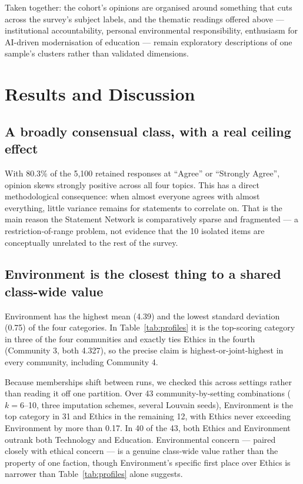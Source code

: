 \documentclass[11pt,a4paper]{article}
\begin{document}
Taken together: the cohort's opinions are organised around something that cuts across the survey's subject labels, and the thematic readings offered above --- institutional accountability, personal environmental responsibility, enthusiasm for AI-driven modernisation of education --- remain exploratory descriptions of one sample's clusters rather than validated dimensions.

\section{Results and Discussion}\label{sec:results}

\subsection{A broadly consensual class, with a real ceiling effect}\label{sec:ceiling}
With 80.3\% of the 5,100 retained responses at ``Agree'' or ``Strongly Agree'', opinion skews strongly positive across all four topics. This has a direct methodological consequence: when almost everyone agrees with almost everything, little variance remains for statements to correlate on. That is the main reason the Statement Network is comparatively sparse and fragmented --- a restriction-of-range problem, not evidence that the 10 isolated items are conceptually unrelated to the rest of the survey.

\subsection{Environment is the closest thing to a shared class-wide value}
Environment has the highest mean (4.39) and the lowest standard deviation (0.75) of the four categories. In Table~\ref{tab:profiles} it is the top-scoring category in three of the four communities and exactly ties Ethics in the fourth (Community 3, both 4.327), so the precise claim is highest-or-joint-highest in every community, including Community 4.

Because memberships shift between runs, we checked this across settings rather than reading it off one partition. Over 43 community-by-setting combinations ($k = 6$--10, three imputation schemes, several Louvain seeds), Environment is the top category in 31 and Ethics in the remaining 12, with Ethics never exceeding Environment by more than 0.17. In 40 of the 43, both Ethics and Environment outrank both Technology and Education. Environmental concern --- paired closely with ethical concern --- is a genuine class-wide value rather than the property of one faction, though Environment's specific first place over Ethics is narrower than Table~\ref{tab:profiles} alone suggests.
\end{document}
